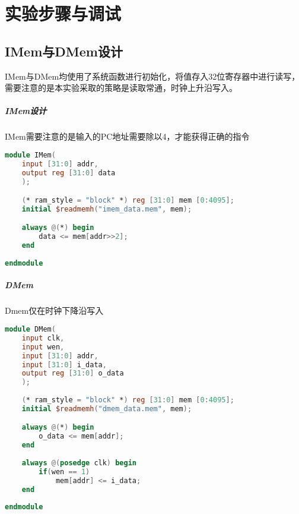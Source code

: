 
\section{实验步骤与调试}
\subsection{IMem与DMem设计}
IMem与DMem均使用了系统函数进行初始化，将值存入32位寄存器中进行读写，需要注意的是本实验采取的策略是读取常通，时钟上升沿写入。

\subparagraph{IMem设计} 
IMem需要注意的是输入的PC地址需要除以4，才能获得正确的指令
\begin{lstlisting}[language = {verilog}]
module IMem(
    input [31:0] addr,
    output reg [31:0] data
    );

    (* ram_style = "block" *) reg [31:0] mem [0:4095];
    initial $readmemh("imem_data.mem", mem);

    always @(*) begin
        data <= mem[addr>>2];
    end    
    
endmodule
\end{lstlisting}

\subparagraph{DMem}
Dmem仅在时钟下降沿写入
\begin{lstlisting}[language = {verilog}]
module DMem(
    input clk,
    input wen,
    input [31:0] addr,
    input [31:0] i_data,
    output reg [31:0] o_data
    );
    
    (* ram_style = "block" *) reg [31:0] mem [0:4095];
    initial $readmemh("dmem_data.mem", mem);

    always @(*) begin
        o_data <= mem[addr];
    end   
    
    always @(posedge clk) begin
        if(wen == 1)
            mem[addr] <= i_data;
    end
    
endmodule
\end{lstlisting}

